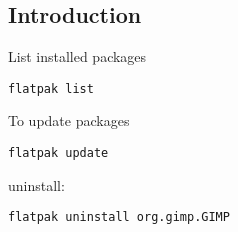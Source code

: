 
\subsection{Introduction}


List installed packages
\begin{verbatim}
flatpak list
\end{verbatim}

To update packages

\begin{verbatim}
flatpak update
\end{verbatim}

uninstall:

\begin{verbatim}
flatpak uninstall org.gimp.GIMP
\end{verbatim}

